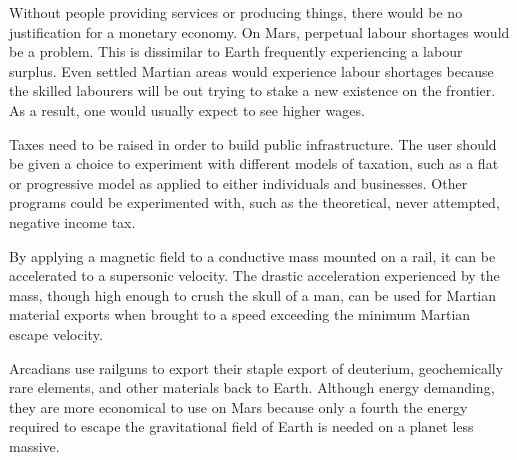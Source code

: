 Without people providing services or producing things, there would be no justification for a monetary economy. On Mars, perpetual labour shortages would be a problem. This is dissimilar to Earth frequently experiencing a labour surplus. Even settled Martian areas would experience labour shortages because the skilled labourers will be out trying to stake a new existence on the frontier. As a result, one would usually expect to see higher wages.

Taxes need to be raised in order to build public infrastructure. The user should be given a choice to experiment with different models of taxation, such as a flat or progressive model as applied to either individuals and businesses. Other programs could be experimented with, such as the theoretical, never attempted, negative income tax.

By applying a magnetic field to a conductive mass mounted on a rail, it can be accelerated to a supersonic velocity. The drastic acceleration experienced by the mass, though high enough to crush the skull of a man, can be used for Martian material exports when brought to a speed exceeding the minimum Martian escape velocity.

    {}

Arcadians use railguns to export their staple export of deuterium, geochemically rare elements, and other materials back to Earth. Although energy demanding, they are more economical to use on Mars because only a fourth the energy required to escape the gravitational field of Earth is needed on a planet less massive.

